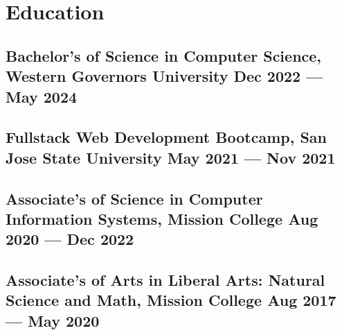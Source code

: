 \documentclass[a4,10pt]{article}
\newenvironment{zitemize}{
\begin{itemize}\itemsep0pt \parskip0pt \parsep1pt}
{\end{itemize}\vspace{-0.5cm}}
\begin{document}
\section{Education}
\subsection*{Bachelor's of Science in Computer Science, {\normalsize \normalfont Western Governors University} \hfill Dec 2022 --- May 2024} 
\vspace{0.2cm}
\subsection*{Fullstack Web Development Bootcamp, {\normalsize \normalfont San Jose State University} \hfill May 2021 --- Nov 2021} 
\vspace{0.2cm}
\subsection*{Associate's of Science in Computer Information Systems, {\normalsize \normalfont Mission College} \hfill Aug 2020 --- Dec 2022} 
\vspace{0.2cm}
\subsection*{Associate's of Arts in Liberal Arts: Natural Science and Math, {\normalsize \normalfont Mission College} \hfill Aug 2017 --- May 2020} 
{\hfill}




\end{document}
